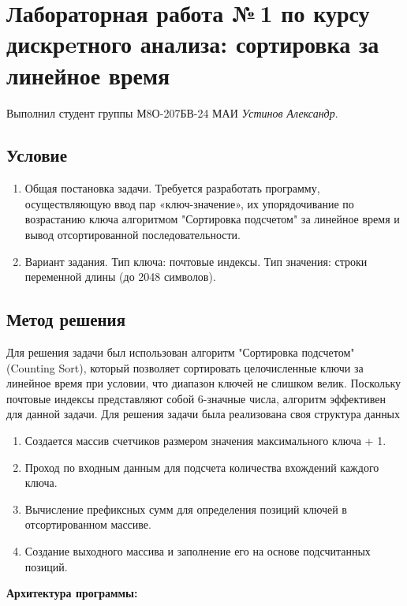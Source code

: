 \documentclass[12pt]{article}
\begin{document}
\section*{Лабораторная работа №\,1 по курсу дискрeтного анализа: сортировка за линейное время}

Выполнил студент группы М8О-207БВ-24 МАИ \textit{Устинов Александр}.

\subsection*{Условие}
 
\begin{enumerate}
\item Общая постановка задачи.
Требуется разработать программу, осуществляющую ввод пар «ключ-значение», 
их упорядочивание по возрастанию ключа алгоритмом "Сортировка подсчетом" за 
линейное время и вывод отсортированной последовательности. 

\item Вариант задания.
Тип ключа: почтовые индексы.
Тип значения: строки переменной длины (до 2048 символов).
\end{enumerate}

\subsection*{Метод решения}

Для решения задачи был использован алгоритм "Сортировка подсчетом" (Counting Sort), который позволяет сортировать целочисленные ключи за линейное время при условии,
что диапазон ключей не слишком велик. Поскольку почтовые индексы представляют собой 6-значные числа, алгоритм эффективен для данной задачи.
Для решения задачи была реализована своя структура данных 

\begin{enumerate}
\item Создается массив счетчиков размером значения максимального ключа + 1.
\item Проход по входным данным для подсчета количества вхождений каждого ключа.
\item Вычисление префиксных сумм для определения позиций ключей в отсортированном массиве.
\item Создание выходного массива и заполнение его на основе подсчитанных позиций.
\end{enumerate}

\textbf{Архитектура программы:}
\end{document}
